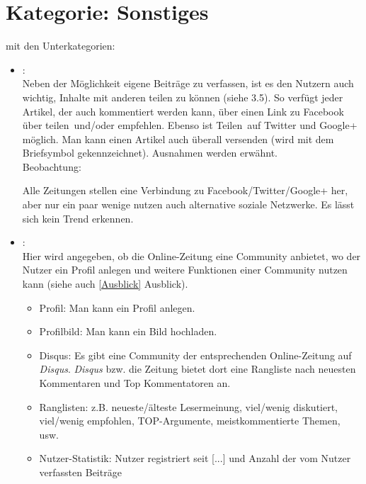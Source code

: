 \section{Kategorie: \glqq Sonstiges\grqq} 

mit den Unterkategorien:
\begin{itemize}[noitemsep]
  \item{}\grqq:\\
    Neben der Möglichkeit eigene Beiträge zu verfassen, ist es den Nutzern auch
    wichtig, Inhalte mit anderen teilen zu können (siehe 3.5). So verfügt jeder
    Artikel, der auch kommentiert werden kann, über einen Link zu Facebook über
    \glqq teilen\grqq\ und/oder \glqq empfehlen\grqq.  Ebenso ist \glqq
    Teilen\grqq\ auf Twitter und Google+ möglich. Man kann einen Artikel auch
    überall versenden (wird mit dem Briefsymbol gekennzeichnet). Ausnahmen
    werden erwähnt.\\
    Beobachtung: 
    
    Alle Zeitungen stellen eine Verbindung zu Facebook/Twitter/Google+
    her, aber nur ein paar wenige nutzen auch alternative soziale Netzwerke. Es lässt 
    sich kein Trend erkennen. 

  \item{}\grqq:\\
    Hier wird angegeben, ob die Online-Zeitung eine Community anbietet, wo der
    Nutzer ein Profil anlegen und weitere Funktionen einer Community nutzen
    kann (siehe auch \ref{Ausblick} \glqq Ausblick\grqq).
    \begin{itemize}[noitemsep]
      \item Profil: Man kann ein Profil anlegen.
      \item Profilbild: Man kann ein Bild hochladen.
      \item Disqus: Es gibt eine Community der entsprechenden Online-Zeitung auf
        {\slshape Disqus}. {\slshape Disqus} bzw.  die Zeitung bietet dort eine Rangliste nach \glqq
        neuesten Kommentaren\grqq{} und  \glqq Top Kommentatoren\grqq{} an.
      \item Ranglisten: z.B. neueste/älteste Lesermeinung, viel/\-we\-nig
        diskutiert, viel/we\-nig empfohlen, TOP-Argumente, meistkommentierte
        Themen, usw.
      \item Nutzer-Statistik: Nutzer registriert seit [...] und
        Anzahl der vom Nutzer verfassten Beiträge
    \end{itemize}


\end{itemize}
